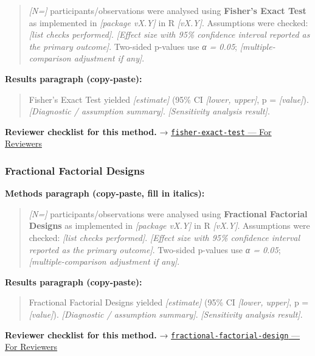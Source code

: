 \documentclass[
]{article}
\begin{document}
\begin{quote}
\emph{{[}N={]}} participants/observations were analysed using
\textbf{Fisher's Exact Test} as implemented in \emph{{[}package vX.Y{]}}
in R \emph{{[}vX.Y{]}}. Assumptions were checked: \emph{{[}list checks
performed{]}}. \emph{{[}Effect size with 95\% confidence interval
reported as the primary outcome{]}}. Two-sided p-values use \emph{α =
0.05}; \emph{{[}multiple-comparison adjustment if any{]}}.
\end{quote}

\textbf{Results paragraph (copy-paste):}

\begin{quote}
Fisher's Exact Test yielded \emph{{[}estimate{]}} (95\% CI
\emph{{[}lower, upper{]}}, p = \emph{{[}value{]}}). \emph{{[}Diagnostic
/ assumption summary{]}}. \emph{{[}Sensitivity analysis result{]}}.
\end{quote}

\textbf{Reviewer checklist for this method.} →
\href{../chapters/04-inferential/fisher-exact-test.Rmd\#for-reviewers}{\texttt{fisher-exact-test}
--- For Reviewers}

\subsubsection{Fractional Factorial
Designs}\label{fractional-factorial-designs}

\textbf{Methods paragraph (copy-paste, fill in italics):}

\begin{quote}
\emph{{[}N={]}} participants/observations were analysed using
\textbf{Fractional Factorial Designs} as implemented in \emph{{[}package
vX.Y{]}} in R \emph{{[}vX.Y{]}}. Assumptions were checked: \emph{{[}list
checks performed{]}}. \emph{{[}Effect size with 95\% confidence interval
reported as the primary outcome{]}}. Two-sided p-values use \emph{α =
0.05}; \emph{{[}multiple-comparison adjustment if any{]}}.
\end{quote}

\textbf{Results paragraph (copy-paste):}

\begin{quote}
Fractional Factorial Designs yielded \emph{{[}estimate{]}} (95\% CI
\emph{{[}lower, upper{]}}, p = \emph{{[}value{]}}). \emph{{[}Diagnostic
/ assumption summary{]}}. \emph{{[}Sensitivity analysis result{]}}.
\end{quote}

\textbf{Reviewer checklist for this method.} →
\href{../chapters/16-design/fractional-factorial-design.Rmd\#for-reviewers}{\texttt{fractional-factorial-design}
--- For Reviewers}
\end{document}
